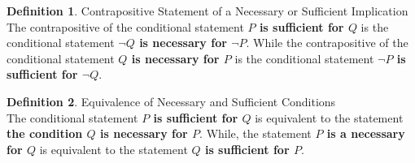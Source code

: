 \documentclass{book}
\theoremstyle{definition}
\newtheorem{definition}{Definition}[section]
\theoremstyle{remark}
\begin{document}
\begin{definition}
Contrapositive Statement of a Necessary or Sufficient Implication \\

The contrapositive of the conditional statement {\bf $P$ is sufficient for $Q$} is the conditional statement {\bf $\neg Q$ is necessary for  $\neg P$}. While the contrapositive of the conditional statement {\bf $Q$ is necessary for $P$} is the conditional statement {\bf $\neg P$ is sufficient for $\neg Q$}. 
\end{definition}



\begin{definition}
Equivalence of Necessary and Sufficient Conditions \\
The conditional statement {\bf $P$ is sufficient for $Q$} is equivalent to the statement {\bf the condition $Q$ is necessary for $P$}. While, the statement {\bf $P$ is a necessary for $Q$} is equivalent to the statement {\bf $Q$ is sufficient for $P$}. \\
\end{definition}


\end{document}
